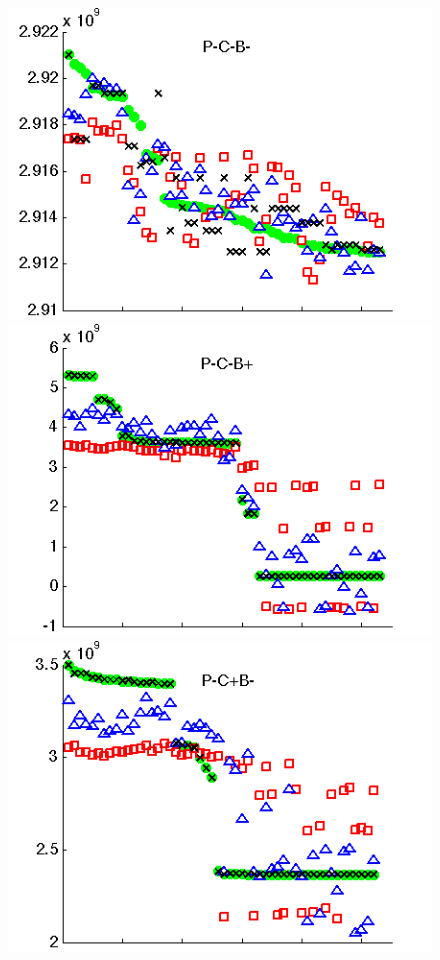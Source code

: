 \begin{figure}
	\centering
	\includegraphics[scale = 0.34] {Figures/ooo_trainpredplot.png}
	\includegraphics[scale = 0.34] {Figures/oop_trainpredplot.png}
	\includegraphics[scale = 0.34] {Figures/opo_trainpredplot.png}

\end{figure}
